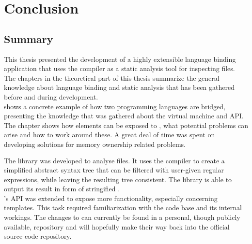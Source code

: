 \part{Conclusion}
\chapter{Summary}
\label{chap:Summary}

This thesis presented the development of a highly extensible language binding application that uses the  compiler as a static analysis tool for inspecting  files.\\
The chapters in the theoretical part of this thesis summarize the general knowledge about language binding and static analysis that has been gathered before and during development.\\
 shows a concrete example of how two programming languages are bridged, presenting the knowledge that was gathered about the   virtual machine and API. The chapter shows how  elements can be exposed to , what potential problems can arise and how to work around these. A great deal of time was spent on developing solutions for memory ownership related problems.

The  library was developed to analyse  files. It uses the  compiler to create a simplified abstract syntax tree that can be filtered with user-given regular expressions, while leaving the resulting tree consistent. The library is able to output its result in form of stringified .\\
's  API was extended to expose more  functionality, especially concerning  templates. This task required familiarization with the  code base and its internal workings. The changes to  can currently be found in a personal, though publicly available,  repository and will hopefully make their way back into the official  source code repository.

